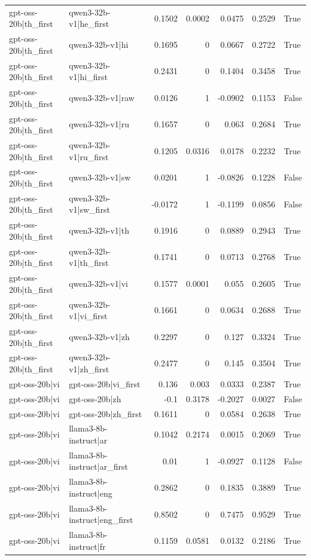 \begin{table}
\begin{tabular}{l l r r r r l}
gpt-oss-20b|th_first & qwen3-32b-v1|he_first & 0.1502 & 0.0002 & 0.0475 & 0.2529 & True \\
gpt-oss-20b|th_first & qwen3-32b-v1|hi & 0.1695 & 0 & 0.0667 & 0.2722 & True \\
gpt-oss-20b|th_first & qwen3-32b-v1|hi_first & 0.2431 & 0 & 0.1404 & 0.3458 & True \\
gpt-oss-20b|th_first & qwen3-32b-v1|raw & 0.0126 & 1 & -0.0902 & 0.1153 & False \\
gpt-oss-20b|th_first & qwen3-32b-v1|ru & 0.1657 & 0 & 0.063 & 0.2684 & True \\
gpt-oss-20b|th_first & qwen3-32b-v1|ru_first & 0.1205 & 0.0316 & 0.0178 & 0.2232 & True \\
gpt-oss-20b|th_first & qwen3-32b-v1|sw & 0.0201 & 1 & -0.0826 & 0.1228 & False \\
gpt-oss-20b|th_first & qwen3-32b-v1|sw_first & -0.0172 & 1 & -0.1199 & 0.0856 & False \\
gpt-oss-20b|th_first & qwen3-32b-v1|th & 0.1916 & 0 & 0.0889 & 0.2943 & True \\
gpt-oss-20b|th_first & qwen3-32b-v1|th_first & 0.1741 & 0 & 0.0713 & 0.2768 & True \\
gpt-oss-20b|th_first & qwen3-32b-v1|vi & 0.1577 & 0.0001 & 0.055 & 0.2605 & True \\
gpt-oss-20b|th_first & qwen3-32b-v1|vi_first & 0.1661 & 0 & 0.0634 & 0.2688 & True \\
gpt-oss-20b|th_first & qwen3-32b-v1|zh & 0.2297 & 0 & 0.127 & 0.3324 & True \\
gpt-oss-20b|th_first & qwen3-32b-v1|zh_first & 0.2477 & 0 & 0.145 & 0.3504 & True \\
gpt-oss-20b|vi & gpt-oss-20b|vi_first & 0.136 & 0.003 & 0.0333 & 0.2387 & True \\
gpt-oss-20b|vi & gpt-oss-20b|zh & -0.1 & 0.3178 & -0.2027 & 0.0027 & False \\
gpt-oss-20b|vi & gpt-oss-20b|zh_first & 0.1611 & 0 & 0.0584 & 0.2638 & True \\
gpt-oss-20b|vi & llama3-8b-instruct|ar & 0.1042 & 0.2174 & 0.0015 & 0.2069 & True \\
gpt-oss-20b|vi & llama3-8b-instruct|ar_first & 0.01 & 1 & -0.0927 & 0.1128 & False \\
gpt-oss-20b|vi & llama3-8b-instruct|eng & 0.2862 & 0 & 0.1835 & 0.3889 & True \\
gpt-oss-20b|vi & llama3-8b-instruct|eng_first & 0.8502 & 0 & 0.7475 & 0.9529 & True \\
gpt-oss-20b|vi & llama3-8b-instruct|fr & 0.1159 & 0.0581 & 0.0132 & 0.2186 & True \\

\end{tabular}
\end{table}
